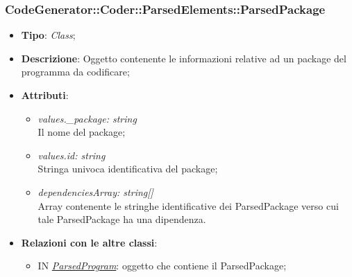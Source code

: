 \documentclass[../DefinizioneDiProdotto.tex]{subfiles}
\begin{document}
			\subsubsection{CodeGenerator::Coder::ParsedElements::ParsedPackage}
			\hypertarget{SWEDesigner::Server::CodeGenerator::Coder::ParsedElements::ParsedPackage}{}
			\begin{itemize}
				\item \textbf{Tipo}: \emph{Class};
				\item \textbf{Descrizione}: Oggetto contenente le informazioni relative ad un package del programma da codificare;
				\item \textbf{Attributi}:
				\begin{itemize}
					\item \emph{values.\_package: string}\\
					Il nome del package;
					\item \emph{values.id: string} \\
					Stringa univoca identificativa del package;
					\item \emph{dependenciesArray: string[]} \\
					Array contenente le stringhe identificative dei ParsedPackage verso cui tale ParsedPackage ha una dipendenza.
				\end{itemize}
				\item \textbf{Relazioni con le altre classi}:
				\begin{itemize}
					\item IN \hyperlink{SWEDesigner::Server::CodeGenerator::Coder::ParsedElements::ParsedProgram}{\emph{ParsedProgram}}: oggetto che contiene il ParsedPackage;
				\end{itemize}
			\end{itemize}
\end{document}
